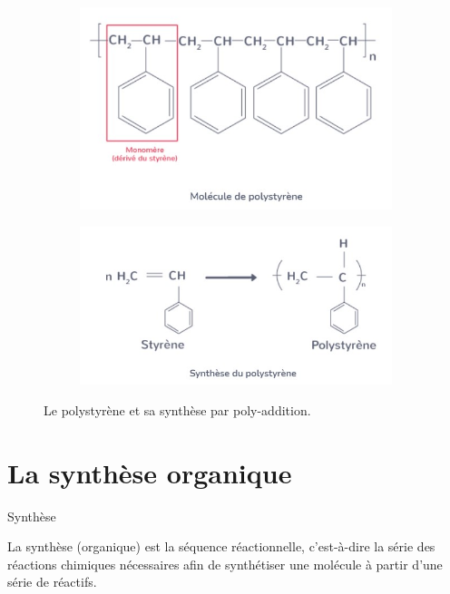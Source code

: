 \documentclass[11pt,a4paper]{article}
\begin{document}
\begin{figure}[ht]
\centering
\begin{subfigure}{.45\textwidth}
  \centering
  \includegraphics[width=.95\linewidth]{imgs/c5/polymere1.jpg}  
\end{subfigure}
\begin{subfigure}{.45\textwidth}
  \centering
  \includegraphics[width=.95\linewidth]{imgs/c5/polymere2.jpg}  
\end{subfigure}
\caption{Le polystyrène et sa synthèse par poly-addition.}
\end{figure}

\section{La synthèse organique}
\begin{defn}{Synthèse}

La synthèse (organique) est la séquence réactionnelle, c'est-à-dire la série des réactions chimiques nécessaires afin de synthétiser une molécule à partir d'une série de réactifs. 
\end{defn}
\end{document}
